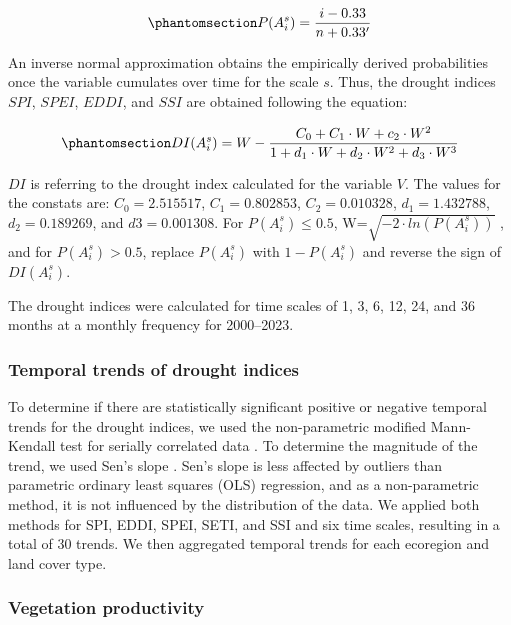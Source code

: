 \documentclass[
  sn-nature,
  numbered]{sn-jnl}
\begin{document}
\begin{equation}\phantomsection\label{eq-probPai}{P(A^s_i) = \frac{i-0.33}{n+0.33'}}\end{equation}

An inverse normal approximation \citep{Abramowitz1968} obtains the
empirically derived probabilities once the variable cumulates over time
for the scale \(s\). Thus, the drought indices \(SPI\), \(SPEI\),
\(EDDI\), and \(SSI\) are obtained following the equation:

\begin{equation}\phantomsection\label{eq-DI}{DI(A^s_i) = W - \frac{C_0+C_1\cdot W + c_2 \cdot W^2}{1+d_1\cdot W +d_2\cdot W^2 +d_3\cdot W^3}}\end{equation}

\(DI\) is referring to the drought index calculated for the variable
\(V\). The values for the constats are: \(C_0 = 2.515517\),
\(C_1 = 0.802853\), \(C_2 = 0.010328\), \(d_1 = 1.432788\),
\(d_2 = 0.189269\), and \(d3 = 0.001308\). For \(P(A^s_i) \leq 0.5\),
W=\(\sqrt{-2\cdot ln(P(A^s_i))}\) , and for \(P(A^s_i) > 0.5\), replace
\(P(A^s_i)\) with \(1-P(A^s_i)\) and reverse the sign of \(DI(A^s_i)\).

The drought indices were calculated for time scales of 1, 3, 6, 12, 24,
and 36 months at a monthly frequency for 2000--2023.

\subsubsection{Temporal trends of drought
indices}\label{temporal-trends-of-drought-indices}

To determine if there are statistically significant positive or negative
temporal trends for the drought indices, we used the non-parametric
modified Mann-Kendall test for serially correlated data \citep{Yue2004}.
To determine the magnitude of the trend, we used Sen's slope
\citep{Sen1968}. Sen's slope is less affected by outliers than
parametric ordinary least squares (OLS) regression, and as a
non-parametric method, it is not influenced by the distribution of the
data. We applied both methods for SPI, EDDI, SPEI, SETI, and SSI and six
time scales, resulting in a total of 30 trends. We then aggregated
temporal trends for each ecoregion and land cover type.

\subsubsection{Vegetation productivity}\label{vegetation-productivity}
\end{document}
